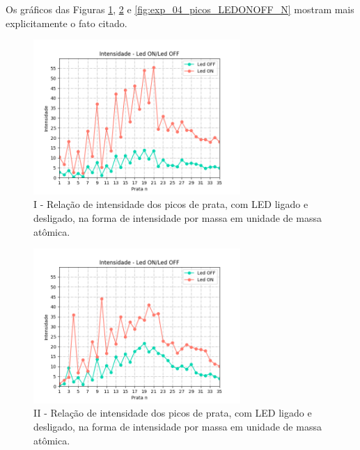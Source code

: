  Os gráficos das Figuras \ref{fig:exp_01_picos_LEDONOFF_N}, \ref{fig:exp_02_picos_LEDONOFF_N} e \ref{fig:exp_04_picos_LEDONOFF_N} mostram mais explicitamente o fato citado.
 
 
 \begin{figure}
  \centering  
  \includegraphics[width=0.7\textwidth]{exp_01/Led_ON_Led_OFF_intensidade_prata_N_.png}
  \caption{I - Relação de intensidade dos picos de prata, com LED ligado e desligado, na forma de intensidade por massa em unidade de massa atômica.}
  \label{fig:exp_01_picos_LEDONOFF_N}
\end{figure}
 
 \begin{figure}
  \centering  
  \includegraphics[width=0.7\textwidth]{exp_02/LED_ON_Led_OFF_intensidade_prata_N_.png}
  \caption{II - Relação de intensidade dos picos de prata, com LED ligado e desligado, na forma de intensidade por massa em unidade de massa atômica.}
  \label{fig:exp_02_picos_LEDONOFF_N}
\end{figure}
 

